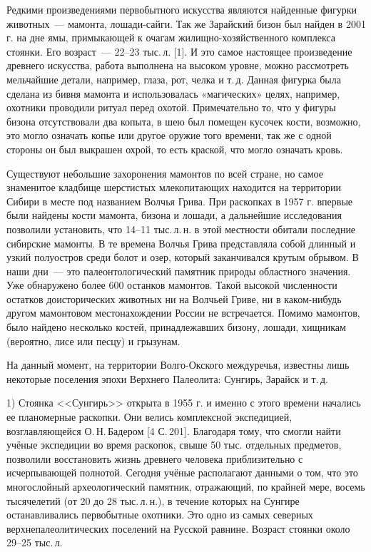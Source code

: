 Редкими произведениями первобытного искусства являются найденные фигурки животных~--- мамонта, лошади-сайги. Так же Зарайский бизон был найден в 2001 г. на дне ямы, примыкающей к очагам жилищно-хозяйственного комплекса стоянки. Его возраст~--- 22--23 тыс.\,л. [1]. И это самое настоящее произведение древнего искусства, работа выполнена на высоком уровне, можно рассмотреть мельчайшие детали, например, глаза, рот, челка и т.\,д. Данная фигурка была сделана из бивня мамонта и использовалась «магических» целях, например, охотники проводили ритуал перед охотой. Примечательно то, что у фигуры бизона отсутствовали два копыта, в шею был помещен кусочек кости, возможно, это могло означать копье или другое оружие того времени, так же с одной стороны он был выкрашен охрой, то есть краской, что могло означать кровь.

Существуют небольшие захоронения мамонтов по всей стране, но самое знаменитое кладбище шерстистых млекопитающих находится на территории Сибири в месте под названием Волчья Грива. При раскопках в 1957 г. впервые были найдены кости мамонта, бизона и лошади, а дальнейшие исследования позволили установить, что 14--11 тыс.\,л.\,н. в этой местности обитали последние сибирские мамонты. В те времена Волчья Грива представляла собой длинный и узкий полуостров среди болот и озер, который заканчивался крутым обрывом. В наши дни~--- это палеонтологический памятник природы областного значения. Уже обнаружено более 600 останков мамонтов. Такой высокой численности остатков доисторических животных ни на Волчьей Гриве, ни в каком-нибудь другом мамонтовом местонахождении России не встречается. Помимо мамонтов, было найдено несколько костей, принадлежавших бизону, лошади, хищникам (вероятно, лисе или песцу) и грызунам.

На данный момент, на территории Волго-Окского междуречья, известны лишь некоторые поселения эпохи Верхнего Палеолита: Сунгирь, Зарайск и т.\,д.

1) Стоянка <<Сунгирь>> открыта в 1955 г. и именно с этого времени начались ее планомерные раскопки. Они велись комплексной экспедицией, возглавляющейся О.\,Н.\,Бадером [4 С.\,201]. Благодаря тому, что смогли найти учёные экспедиции во время раскопок, свыше 50 тыс. отдельных предметов, позволили восстановить жизнь древнего человека приблизительно с исчерпывающей полнотой. Сегодня учёные располагают данными о том, что это многослойный археологический памятник, отражающий, по крайней мере, восемь тысячелетий (от 20 до 28 тыс.\,л.\,н.), в течение которых на Сунгире останавливались первобытные охотники. Это одно из самых северных верхнепалеолитических поселений на Русской равнине. Возраст стоянки около 29--25 тыс.\,л.

